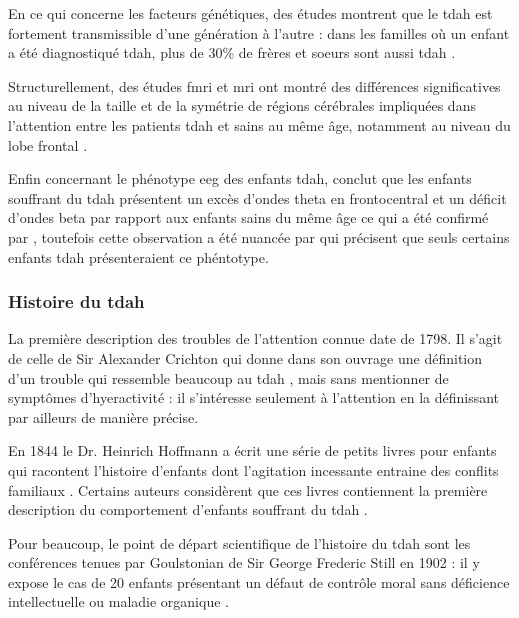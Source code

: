 En ce qui concerne les facteurs génétiques, des études montrent que le \gls{tdah} est fortement transmissible d'une génération à l'autre \citep{Larsson2014} :
dans les familles où un enfant a été diagnostiqué \gls{tdah}, plus de 30\% de frères et soeurs sont aussi \gls{tdah} \citep{Monastra2005}.

Structurellement, des études \gls{fmri} et \gls{mri} ont montré des différences significatives au niveau de la taille et de la symétrie de régions cérébrales impliquées
dans l'attention entre les patients \gls{tdah} et sains au même âge, notamment au niveau du lobe frontal \citep{Monastra2005}.  

Enfin concernant le phénotype \gls{eeg} des enfants \gls{tdah}, \citet{Lubar1991} conclut que les enfants souffrant du \gls{tdah} présentent un excès 
d'ondes theta en frontocentral \citep{Loo2010} et un déficit d'ondes beta par rapport aux enfants sains du même âge ce qui a été confirmé par \citet{Barry2003}, toutefois cette observation 
a été nuancée par \citet{Arns2012} qui précisent que seuls certains enfants \gls{tdah} présenteraient ce phéntotype. 

\subsubsection{Histoire du \gls{tdah}} \label{adhd_history}

La première description des troubles de l'attention connue date de 1798. Il s'agit de celle de Sir Alexander Crichton qui donne dans son ouvrage 
une définition d'un trouble 
qui ressemble beaucoup au \gls{tdah} \citep{Crichton1798}, mais sans mentionner de symptômes d'hyeractivité : il s'intéresse seulement à l'attention
en la définissant par ailleurs de manière précise. 

En 1844 le Dr. Heinrich Hoffmann a écrit une série de petits livres pour enfants qui racontent l'histoire d'enfants dont l'agitation incessante 
entraine des conflits familiaux \citep{Lange2010}. Certains auteurs considèrent que ces livres contiennent la première description du comportement d'enfants 
souffrant du \gls{tdah} \citep{Burd1988, Kopf2006}.  

Pour beaucoup, le point de départ scientifique de l'histoire du \gls{tdah} sont les conférences tenues par Goulstonian de Sir George Frederic Still 
en 1902 \citep{Barkley2006, Conners2000, Palmer2001, Rafalovich2001} : il y expose le cas de 20 enfants présentant un défaut de contrôle moral sans
déficience intellectuelle ou maladie organique \citep{Still1902}. 

